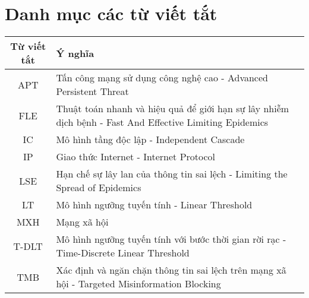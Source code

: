 \chapter*{Danh mục các từ viết tắt}
\quad 
\begin{table}[h]
\begin{center}
\large{
\begin{tabular}{|c|p{12cm}|}
\hline
\textbf{Từ viết tắt} & \textbf{Ý nghĩa}\\
\hline
APT & Tấn công mạng sử dụng công nghệ cao - Advanced Persistent Threat\\
\hline
FLE & Thuật toán nhanh và hiệu quả để giới hạn sự lây nhiễm dịch bệnh - Fast And Effective Limiting Epidemics\\
\hline
IC & Mô hình tầng độc lập - Independent Cascade\\
\hline
IP & Giao thức Internet - Internet Protocol\\
\hline
LSE & Hạn chế sự lây lan của thông tin sai lệch - Limiting the Spread of Epidemics\\
\hline
LT & Mô hình ngưỡng tuyến tính - Linear Threshold\\
\hline
MXH & Mạng xã hội\\
\hline
T-DLT & Mô hình ngưỡng tuyến tính với bước thời gian rời rạc - Time-Discrete Linear Threshold\\
\hline
TMB & Xác định và ngăn chặn thông tin sai lệch trên mạng xã hội - Targeted Misinformation Blocking\\
\hline
\end{tabular}
}
\end{center}
\end{table}